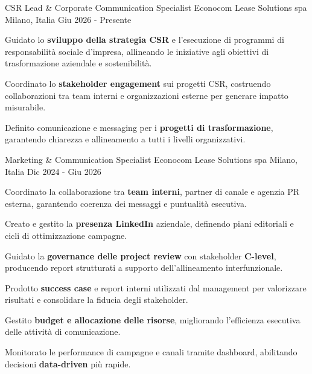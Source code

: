 
\begin{cventries}

\cventry
{CSR Lead \& Corporate Communication Specialist} %
{Econocom Lease Solutions spa} %
{Milano, Italia} %
{Giu 2026 - Presente} %
{
\begin{cvitems}
\item Guidato lo \textbf{sviluppo della strategia CSR} e l'esecuzione di programmi di responsabilità sociale d'impresa, allineando le iniziative agli obiettivi di trasformazione aziendale e sostenibilità.
\item Coordinato lo \textbf{stakeholder engagement} sui progetti CSR, costruendo collaborazioni tra team interni e organizzazioni esterne per generare impatto misurabile.
\item Definito comunicazione e messaging per i \textbf{progetti di trasformazione}, garantendo chiarezza e allineamento a tutti i livelli organizzativi.
\end{cvitems}
}

\cventry
{Marketing \& Communication Specialist} %
{Econocom Lease Solutions spa} %
{Milano, Italia} %
{Dic 2024 - Giu 2026} %
{
\begin{cvitems}
\item Coordinato la collaborazione tra \textbf{team interni}, partner di canale e agenzia PR esterna, garantendo coerenza dei messaggi e puntualità esecutiva.
\item Creato e gestito la \textbf{presenza LinkedIn} aziendale, definendo piani editoriali e cicli di ottimizzazione campagne.
\item Guidato la \textbf{governance delle project review} con stakeholder \textbf{C-level}, producendo report strutturati a supporto dell'allineamento interfunzionale.
\item Prodotto \textbf{success case} e report interni utilizzati dal management per valorizzare risultati e consolidare la fiducia degli stakeholder.
\item Gestito \textbf{budget e allocazione delle risorse}, migliorando l'efficienza esecutiva delle attività di comunicazione.
\item Monitorato le performance di campagne e canali tramite dashboard, abilitando decisioni \textbf{data-driven} più rapide.
\end{cvitems}
}


\end{cventries}
